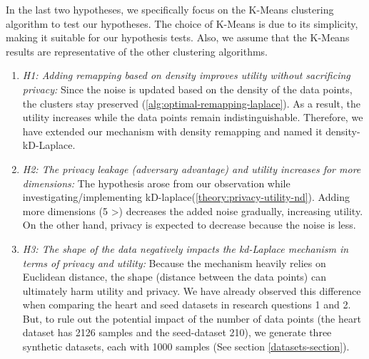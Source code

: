 \begin{enumerate}
            In the last two hypotheses, we specifically focus on the K-Means clustering algorithm to test our hypotheses.
            The choice of K-Means is due to its simplicity, making it suitable for our hypothesis tests.
            Also, we assume that the K-Means results are representative of the other clustering algorithms.
            \begin{enumerate}
                  \item \textit{H1: Adding remapping based on density improves utility without sacrificing privacy:}
                        Since the noise is updated based on the density of the data points, the clusters stay preserved (\ref{alg:optimal-remapping-laplace}).
                        As a result, the utility increases while the data points remain indistinguishable.
                        Therefore, we have extended our mechanism with density remapping and named it density-kD-Laplace.
                  \item \textit{H2: The privacy leakage (adversary advantage) and utility increases for more dimensions:}
                        The hypothesis arose from our observation while investigating/implementing kD-laplace(\ref{theory:privacy-utility-nd}).
                        Adding more dimensions (5 >) decreases the added noise gradually, increasing utility.
                        On the other hand, privacy is expected to decrease because the noise is less.
                  \item \textit{H3: The shape of the data negatively impacts the kd-Laplace mechanism in terms of privacy and utility:}
                        Because the mechanism heavily relies on Euclidean distance, the shape (distance between the data points) can ultimately harm utility and privacy.
                        We have already observed this difference when comparing the heart and seed datasets in research questions 1 and 2.
                        But, to rule out the potential impact of the number of data points (the heart dataset has 2126 samples and the seed-dataset 210), we generate three synthetic datasets, each with 1000 samples (See section \ref{datasets-section}).
            \end{enumerate}
\end{enumerate}

